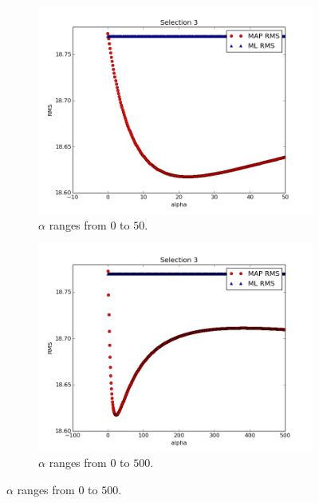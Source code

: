\documentclass[a4paper]{article}
\begin{document}
\begin{figure}[H]
  \begin{adjustwidth}{-7em}{-7em}
    \centering
    \begin{subfigure}{.32\linewidth}
      \includegraphics[width=\linewidth]{figures/alpha_vs_rms_selection3a.png}
      \caption{$\alpha$ ranges from $0$ to $50$.}
      \label{fig:alpha_vs_rms_selection3a}
    \end{subfigure}
    \begin{subfigure}{.32\linewidth}
      \includegraphics[width=\linewidth]{figures/alpha_vs_rms_selection3b.png}
      \caption{$\alpha$ ranges from $0$ to $500$.}
      \label{fig:alpha_vs_rms_selection3b}
    \end{subfigure}

\end{adjustwidth}
\end{figure}
\end{document}
